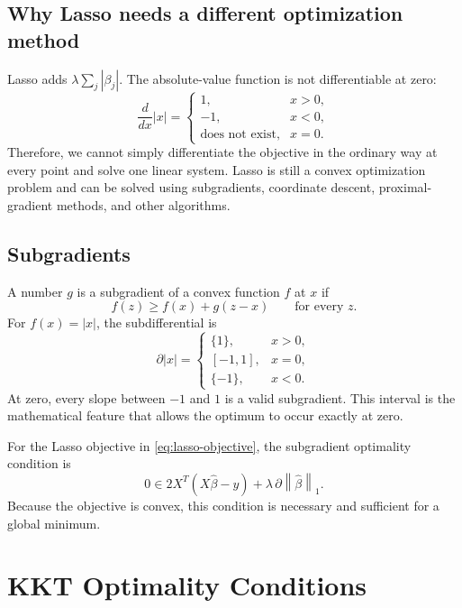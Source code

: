\documentclass[11pt,a4paper]{article}
\numberwithin{equation}{section}
\newcommand{\norm}[1]{\left\lVert #1\right\rVert}
\newcommand{\abs}[1]{\left|#1\right|}
\begin{document}
\subsection{Why Lasso needs a different optimization method}
Lasso adds $\lambda\sum_j\abs{\beta_j}$. The absolute-value function is not differentiable at zero:
\begin{equation}
  \frac{d}{dx}\abs{x}=\begin{cases}
  1,&x>0,\\-1,&x<0,\\\text{does not exist},&x=0.
  \end{cases}
\end{equation}
Therefore, we cannot simply differentiate the objective in the ordinary way at every point and solve one linear system. Lasso is still a convex optimization problem and can be solved using subgradients, coordinate descent, proximal-gradient methods, and other algorithms.

\subsection{Subgradients}
A number $g$ is a subgradient of a convex function $f$ at $x$ if
\begin{equation}
  f(z)\geq f(x)+g(z-x)\qquad\text{for every }z.
\end{equation}
For $f(x)=\abs{x}$, the subdifferential is
\begin{equation}
  \boxed{\partial\abs{x}=\begin{cases}
  \{1\},&x>0,\\[-1pt]
  [-1,1],&x=0,\\[-1pt]
  \{-1\},&x<0.
  \end{cases}}
  \label{eq:abs-subgradient}
\end{equation}
At zero, every slope between $-1$ and $1$ is a valid subgradient. This interval is the mathematical feature that allows the optimum to occur exactly at zero.

For the Lasso objective in \cref{eq:lasso-objective}, the subgradient optimality condition is
\begin{equation}
  \boxed{0\in 2X^T(X\hat\beta-y)+\lambda\,\partial\norm{\hat\beta}_1.}
  \label{eq:lasso-subgrad-condition}
\end{equation}
Because the objective is convex, this condition is necessary and sufficient for a global minimum.

\section{KKT Optimality Conditions}
\end{document}
